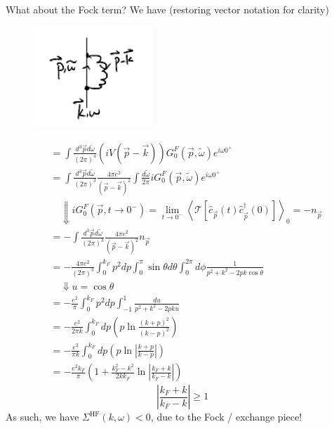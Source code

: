 What about the Fock term? We have (restoring vector notation for clarity)
\begin{figure}[H]
    \centering
    \includegraphics[width=0.4\textwidth]{jupyterbook/data/fig/lec19-fig02.png}
\end{figure}
\begin{align*}
    &=\int{\frac{d^3\vec{p}d\tilde{\omega}}{\left( 2\pi \right) ^4}\left( iV\left( \vec{p}-\vec{k} \right) \right) G_{0}^{F}\left( \vec{p},\tilde{\omega} \right) e^{i\omega 0^+}}\\
    &=\int{\frac{d^3\vec{p}d\tilde{\omega}}{\left( 2\pi \right) ^3}\frac{4\pi e^2}{\left( \vec{p}-\vec{k} \right) ^2}\int{\frac{d\tilde{\omega}}{2\pi}iG_{0}^{F}\left( \vec{p},\tilde{\omega} \right) e^{i\omega 0^+}}}\\
    &\quad \Downarrow iG_{0}^{F}\left( \vec{p},t\rightarrow 0^- \right) =\lim_{t\rightarrow 0^-} \left< \mathcal{T} \left[ \hat{c}_{\vec{p}}\left( t \right) \hat{c}_{\vec{p}}^{\dagger}\left( 0 \right) \right] \right> _0=-n_{\vec{p}}\\
    &=-\int{\frac{d^3\vec{p}d\tilde{\omega}}{\left( 2\pi \right) ^3}\frac{4\pi e^2}{\left( \vec{p}-\vec{k} \right) ^2}n_{\vec{p}}}\\
    &=-\frac{4\pi e^2}{\left( 2\pi \right) ^3}\int_0^{k_F}{p^2dp\int_0^{\pi}{\sin \theta d\theta \int_0^{2\pi}{d\phi \frac{1}{p^2+k^2-2pk\cos \theta}}}}\\
    &\quad \Downarrow u=\cos \theta \\
    &=-\frac{e^2}{\pi}\int_0^{k_F}{p^2dp\int_{-1}^1{\frac{du}{p^2+k^2-2pku}}}\\
    &=-\frac{e^2}{2\pi k}\int_0^{k_F}{dp\left( p\ln \frac{\left( k+p \right) ^2}{\left( k-p \right) ^2} \right)}\\
    &=-\frac{e^2}{\pi k}\int_0^{k_F}{dp\left( p\ln \left| \frac{k+p}{k-p} \right| \right)}\\
    &=-\frac{e^2k_F}{\pi}\left( 1+\frac{k_{F}^{2}-k^2}{2kk_F}\ln \left| \frac{k_F+k}{k_F-k} \right| \right)
\end{align*}
\[ \left| \frac{k_F+k}{k_F-k} \right|\ge 1\]
As such, we have $\Sigma^{\text{HF}}(k,\omega)<0$, due to the Fock / exchange piece!

